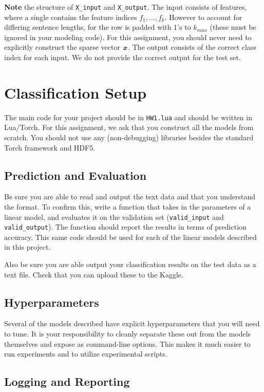 \documentclass[11pt]{article}
\begin{document}
\textbf{Note} the structure of \texttt{X\_input} and
\texttt{X\_output}. The input consists of features, where a single
contains the feature indices $f_1, \ldots, f_k$. However to account
for differing sentence lengths, for the row is padded with 1's to
$k_{max}$ (these must be ignored in your modeling code).  For this
assignment, you should never need to explicitly construct the sparse
vector $\boldsymbol{x}$. The output consists of the correct class index for
each input. We do not provide the correct output for the test set.

\section{Classification Setup}

The main code for your project should be in \texttt{HW1.lua} and
should be written in Lua/Torch. For this assignment, we ask that you
construct all the models from scratch. You should not use any
(non-debugging) libraries besides the standard Torch framework and HDF5.

\subsection{Prediction and Evaluation}

Be sure you are able to read and output the text data and that you
understand the format. To confirm this, write a function that takes in
the parameters of a linear model, and evaluates it on the validation
set (\texttt{valid\_input} and \texttt{valid\_output}).  The function
should report the results in terms of prediction accuracy. This same
code should be used for each of the linear models described in this
project.

Also be sure you are able output your classification results on the
test data as a text file. Check that you can upload these to the
Kaggle.

\subsection{Hyperparameters}

Several of the models described have explicit hyperparameters that you will 
need to tune. It is your responsibility to cleanly separate these out from 
the models themselves and expose as command-line options. This makes it much 
easier to run experiments and to utilize experimental scripts. 

\subsection{Logging and Reporting}
\end{document}

